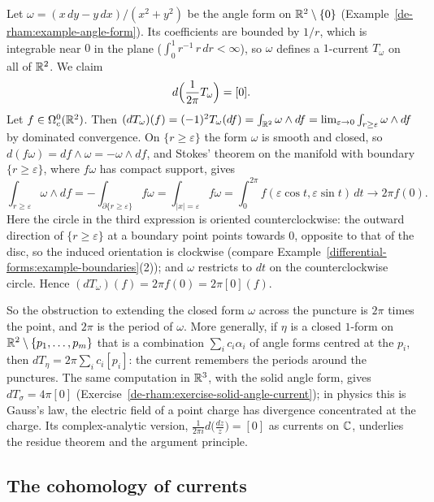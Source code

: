 \begin{example}\label{de-rham:example-angle-current}
Let $\omega = (x\,dy - y\,dx)/(x^2 + y^2)$ be the angle form on $\mathbb{R}^2 \setminus \{0\}$ (Example~\ref{de-rham:example-angle-form}). Its coefficients are bounded by $1/r$, which is integrable near $0$
in the plane ($\int_0^1r^{-1}\,r\,dr < \infty$), so $\omega$ defines a $1$-current $T_\omega$ on all of $\mathbb{R}^2$. We claim
\[
d\Bigl(\frac{1}{2\pi}T_\omega\Bigr) = [0].
\]
Let $f \in \Omega^0_c(\mathbb{R}^2)$. Then $(dT_\omega)(f) = (-1)^2T_\omega(df) = \int_{\mathbb{R}^2}\omega \wedge df = \lim_{\varepsilon \to 0}\int_{r \geq \varepsilon}\omega \wedge df$ by dominated convergence. On
$\{r \geq \varepsilon\}$ the form $\omega$ is smooth and closed, so $d(f\omega) = df \wedge \omega = -\omega \wedge df$, and Stokes' theorem on the manifold with boundary $\{r \geq \varepsilon\}$, where $f\omega$ has
compact support, gives
\[
\int_{r \geq \varepsilon}\omega \wedge df = -\int_{\partial\{r \geq \varepsilon\}}f\omega = \int_{|x| = \varepsilon}f\omega = \int_0^{2\pi}f(\varepsilon\cos t, \varepsilon\sin t)\,dt \longrightarrow 2\pi f(0).
\]
Here the circle in the third expression is oriented counterclockwise: the outward direction of $\{r \geq \varepsilon\}$ at a boundary point points towards $0$, opposite to that of the disc, so
the induced orientation is clockwise (compare Example~\ref{differential-forms:example-boundaries}(2)); and $\omega$ restricts to $dt$ on the counterclockwise circle. Hence
$(dT_\omega)(f) = 2\pi f(0) = 2\pi[0](f)$.
\end{example}

So the obstruction to extending the closed form $\omega$ across the puncture is $2\pi$ times the point, and $2\pi$ is the period of $\omega$. More generally, if $\eta$ is a closed $1$-form on
$\mathbb{R}^2 \setminus \{p_1, \ldots, p_m\}$ that is a combination $\sum_ic_i\alpha_i$ of angle forms centred at the $p_i$, then $d T_\eta = 2\pi\sum_ic_i[p_i]$: the current remembers the periods around the
punctures. The same computation in $\mathbb{R}^3$, with the solid angle form, gives $d T_\sigma = 4\pi[0]$ (Exercise~\ref{de-rham:exercise-solid-angle-current}); in physics this is Gauss's law, the electric
field of a point charge has divergence concentrated at the charge. Its complex-analytic version, $\frac{1}{2\pi i}d\bigl(\frac{dz}{z}\bigr) = [0]$ as currents on $\mathbb{C}$, underlies the residue theorem and the
argument principle.

\subsection{The cohomology of currents}\label{de-rham:subsection-currents-cohomology}

